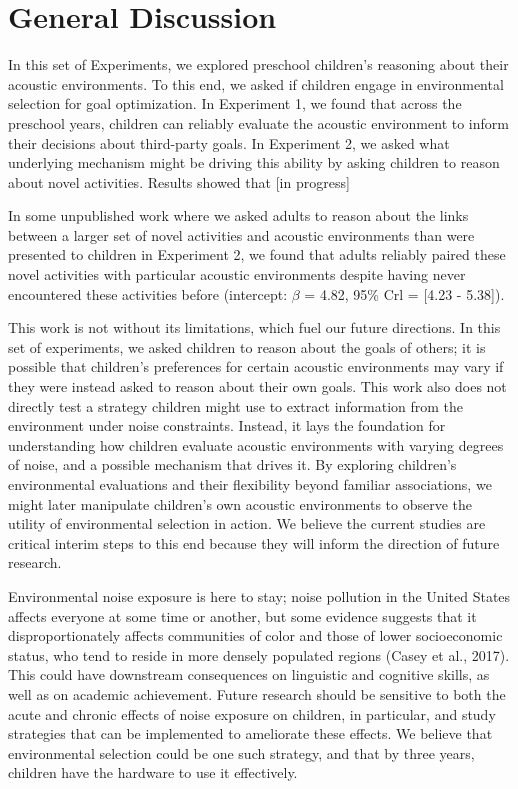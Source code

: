 \documentclass[10pt, letterpaper]{article}
\begin{document}
\hypertarget{general-discussion}{%
\section{General Discussion}\label{general-discussion}}

In this set of Experiments, we explored preschool children's reasoning
about their acoustic environments. To this end, we asked if children
engage in environmental selection for goal optimization. In Experiment
1, we found that across the preschool years, children can reliably
evaluate the acoustic environment to inform their decisions about
third-party goals. In Experiment 2, we asked what underlying mechanism
might be driving this ability by asking children to reason about novel
activities. Results showed that {[}in progress{]}

In some unpublished work where we asked adults to reason about the links
between a larger set of novel activities and acoustic environments than
were presented to children in Experiment 2, we found that adults
reliably paired these novel activities with particular acoustic
environments despite having never encountered these activities before
(intercept: \(\beta\) = 4.82, 95\% Crl = {[}4.23 - 5.38{]}).

This work is not without its limitations, which fuel our future
directions. In this set of experiments, we asked children to reason
about the goals of others; it is possible that children's preferences
for certain acoustic environments may vary if they were instead asked to
reason about their own goals. This work also does not directly test a
strategy children might use to extract information from the environment
under noise constraints. Instead, it lays the foundation for
understanding how children evaluate acoustic environments with varying
degrees of noise, and a possible mechanism that drives it. By exploring
children's environmental evaluations and their flexibility beyond
familiar associations, we might later manipulate children's own acoustic
environments to observe the utility of environmental selection in
action. We believe the current studies are critical interim steps to
this end because they will inform the direction of future research.

Environmental noise exposure is here to stay; noise pollution in the
United States affects everyone at some time or another, but some
evidence suggests that it disproportionately affects communities of
color and those of lower socioeconomic status, who tend to reside in
more densely populated regions (Casey et al., 2017). This could have
downstream consequences on linguistic and cognitive skills, as well as
on academic achievement. Future research should be sensitive to both the
acute and chronic effects of noise exposure on children, in particular,
and study strategies that can be implemented to ameliorate these
effects. We believe that environmental selection could be one such
strategy, and that by three years, children have the hardware to use it
effectively.
\end{document}
